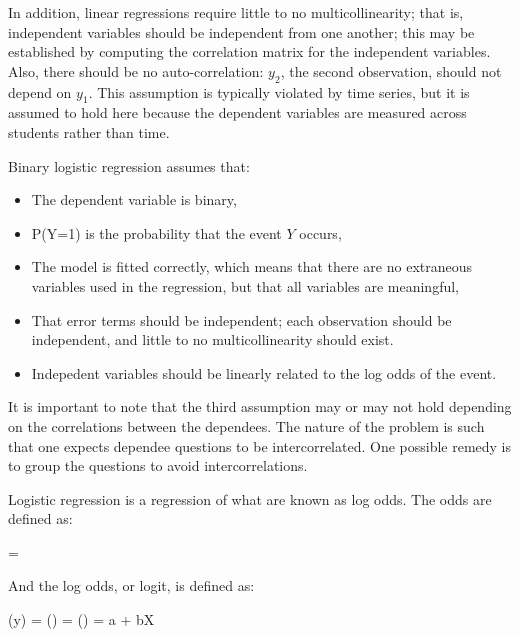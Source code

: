 In addition, linear regressions require little to no multicollinearity; that
is, independent variables should be independent from one another; this may be
established by computing the correlation matrix for the independent variables.
Also, there should be no auto-correlation: $y_2$, the second observation,
should not depend on $y_1$.  This assumption is typically violated by time
series, but it is assumed to hold here because the dependent variables are
measured across students rather than time.  

Binary logistic regression assumes that:

\begin{itemize} 

 \item The dependent variable is binary,
 
 \item P(Y=1) is the probability that the event $Y$ occurs, 
 
 \item The model is fitted correctly, which means that there are no extraneous
 variables used in the regression, but that all variables are meaningful,

 \item That error terms should be independent; each observation should be
 independent, and little to no multicollinearity should exist.  

 \item Indepedent variables should be linearly related to the log odds of
 the event.

\end{itemize} 

It is important to note that the third assumption may or may not hold depending
on the correlations between the dependees.  The nature of the problem is such
that one expects dependee questions to be intercorrelated.  One possible remedy
is to group the questions to avoid intercorrelations.

Logistic regression is a regression of what are known as log odds. The odds
are defined as:

\begin{equations}
   = 
\end{equations}

And the log odds, or logit, is defined as:

\begin{equations}
  \logit(y) = \ln() = \ln\Big(\Big) = a + bX
\end{equations}

